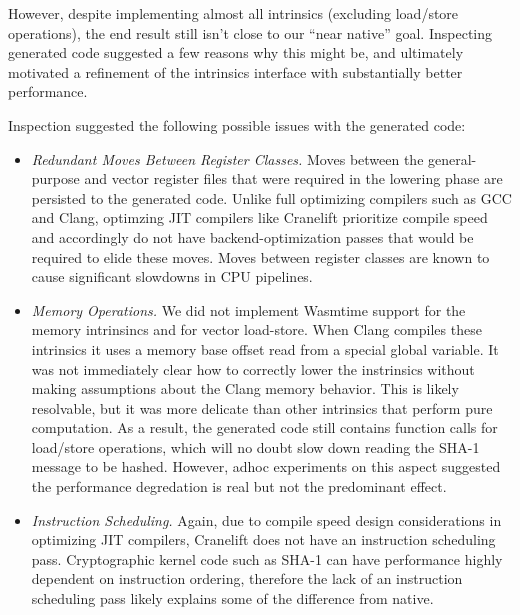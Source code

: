 \begin{center}

\end{center}

However, despite implementing almost all intrinsics (excluding load/store
operations), the end result still isn't close to our ``near native'' goal.
Inspecting generated code suggested a few reasons why this might be, and
ultimately motivated a refinement of the intrinsics interface with substantially
better performance.

Inspection suggested the following possible issues with the generated code:
%
\begin{itemize}
    \item \emph{Redundant Moves Between Register Classes.}
        Moves between the general-purpose and vector register files that were
        required in the lowering phase are persisted to the generated code.
        Unlike full optimizing compilers such as GCC and Clang, optimzing JIT
        compilers like Cranelift prioritize compile speed and accordingly do not
        have backend-optimization passes that would be required to elide these
        moves. Moves between register classes are known to cause significant
        slowdowns in CPU pipelines.
    \item \emph{Memory Operations.}
        We did not implement Wasmtime support for the memory intrinsincs
         and  for vector load-store. When
        Clang compiles these intrinsics it uses a memory base offset read from a
        special global variable. It was not immediately clear how to correctly
        lower the instrinsics without making assumptions about the Clang memory
        behavior. This is likely resolvable, but it was more delicate than other
        intrinsics that perform pure computation. As a result, the generated
        code still contains function calls for load/store operations, which will
        no doubt slow down reading the SHA-1 message to be hashed. However,
        adhoc experiments on this aspect suggested the performance degredation
        is real but not the predominant effect.
    \item \emph{Instruction Scheduling.}
        Again, due to compile speed design considerations in optimizing JIT
        compilers, Cranelift does not have an instruction scheduling pass.
        Cryptographic kernel code such as SHA-1 can have performance highly
        dependent on instruction ordering, therefore the lack of an instruction
        scheduling pass likely explains some of the difference from native.
\end{itemize}

